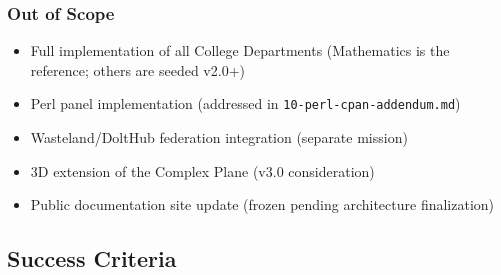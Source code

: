 \documentclass[11pt,letterpaper]{article}
\begin{document}
\subsubsection{Out of Scope}
\begin{itemize}[noitemsep]
  \item Full implementation of all College Departments (Mathematics is the reference; others are seeded v2.0+)
  \item Perl panel implementation (addressed in \texttt{10-perl-cpan-addendum.md})
  \item Wasteland/DoltHub federation integration (separate mission)
  \item 3D extension of the Complex Plane (v3.0 consideration)
  \item Public documentation site update (frozen pending architecture finalization)
\end{itemize}

\subsection{Success Criteria}
\end{document}
